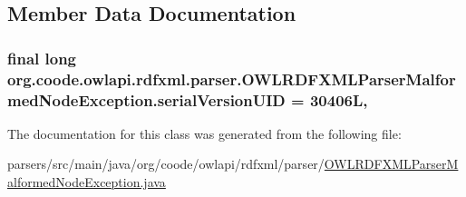 \subsection{Member Data Documentation}
\hypertarget{classorg_1_1coode_1_1owlapi_1_1rdfxml_1_1parser_1_1_o_w_l_r_d_f_x_m_l_parser_malformed_node_exception_a868e53d8d0815e4a00352bef97b11cc7}{
\subsubsection[{serial\-Version\-U\-I\-D}]{\setlength{\rightskip}{0pt plus 5cm}final long org.\-coode.\-owlapi.\-rdfxml.\-parser.\-O\-W\-L\-R\-D\-F\-X\-M\-L\-Parser\-Malformed\-Node\-Exception.\-serial\-Version\-U\-I\-D = 30406\-L\hspace{0.3cm}{\ttfamily [static]}, {\ttfamily [private]}}}\label{classorg_1_1coode_1_1owlapi_1_1rdfxml_1_1parser_1_1_o_w_l_r_d_f_x_m_l_parser_malformed_node_exception_a868e53d8d0815e4a00352bef97b11cc7}


The documentation for this class was generated from the following file\-:\begin{DoxyCompactItemize}
\item 
parsers/src/main/java/org/coode/owlapi/rdfxml/parser/\hyperlink{_o_w_l_r_d_f_x_m_l_parser_malformed_node_exception_8java}{O\-W\-L\-R\-D\-F\-X\-M\-L\-Parser\-Malformed\-Node\-Exception.\-java}\end{DoxyCompactItemize}
